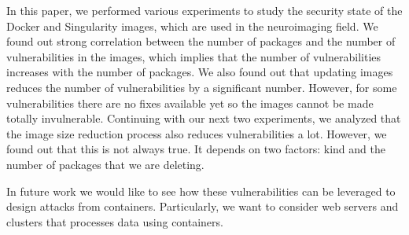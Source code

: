 \documentclass[a4paper,num-refs]{oup-contemporary}
\begin{document}
In this paper, we performed various experiments to study the security state of the Docker
and Singularity images, which are used in the neuroimaging field. We found out strong correlation
between the number of packages and the number of vulnerabilities in the images, which implies
that the number of vulnerabilities increases with the number of packages. We also found out that
updating images reduces the number of vulnerabilities by a significant number. However, for some
vulnerabilities there are no fixes available yet so the images cannot 
be made totally invulnerable. Continuing with our next two experiments, we analyzed that the
image size reduction process also reduces vulnerabilities a lot. However, we found out that this is not
always true. It depends on two factors: kind and the number of packages that we are
deleting.

In future work we would like to see how these vulnerabilities can be leveraged
to design attacks from containers. Particularly, we want
to consider web servers and clusters that processes data using containers.


\end{document}
